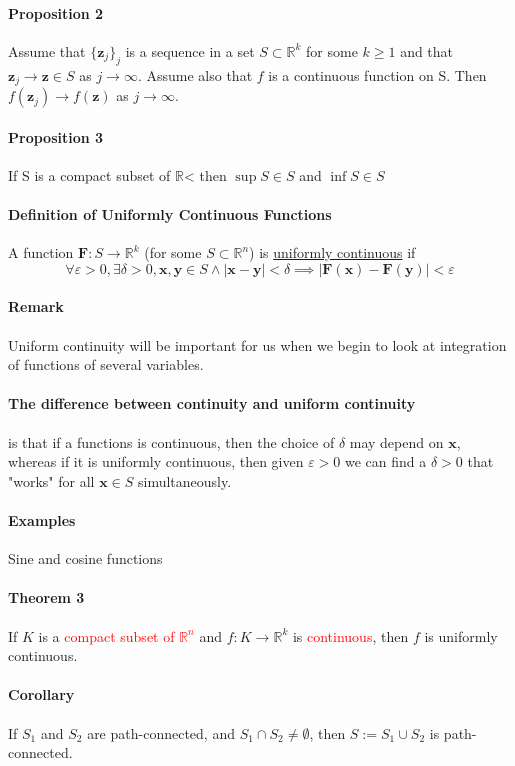\documentclass[11pt]{article}
\newcommand{\tb}[1]{\textbf{#1}}
\newcommand{\real}[0]{\mathbb{R}}
\newcommand{\under}[1]{\underline{#1}}
\newcommand{\vx}[0]{\tb{x}}
\newcommand{\vy}[0]{\tb{y}}
\newcommand{\vz}[0]{\tb{z}}
\newcommand{\vf}[0]{\tb{F}}
\begin{document}
\paragraph{Proposition 2} Assume that $\{\vz_j\}_j$ is a sequence in a set $S \subset \real^k$ for some $k \geq 1$ and that $\vz_j \rightarrow \vz \in S$ as $ j \rightarrow \infty$. Assume also that $f$ is a continuous function on S. Then $f(\vz_j) \rightarrow f(\vz)$ as $j \rightarrow \infty$.
\paragraph{Proposition 3} If S is a compact subset of $\real$< then $\sup S \in S$ and $\inf S \in S$
\paragraph{Definition of Uniformly Continuous Functions} A function $\vf: S \rightarrow \real^k$ (for some $S \subset \real^n$) is \under{uniformly continuous} if
$$\forall \varepsilon > 0, \exists \delta > 0, \vx, \vy \in S \wedge |\vx - \vy| < \delta \implies |\vf(\vx) - \vf(\vy)| < \varepsilon$$
\paragraph{Remark} Uniform continuity will be important for us when we begin to look at integration of functions of several variables. 
\paragraph{The difference between continuity and uniform continuity} is that if a functions is continuous, then the choice of $\delta$ may depend on $\vx$, whereas if it is uniformly continuous, then given $\varepsilon >0$ we can find a $\delta > 0$ that "works" for all $\vx \in S$ simultaneously.
\paragraph{Examples} Sine and cosine functions
\paragraph{Theorem 3} If $K$ is a \textcolor{red}{compact subset of $\real^n$} and $f: K \rightarrow \real^k$ is \textcolor{red}{continuous}, then $f$ is uniformly continuous.
\paragraph{Corollary}
If $S_1$ and $S_2$ are path-connected, and $S_1 \cap S_2 \neq \emptyset$, then $S := S_1 \cup S_2$ is path-connected.
\end{document}
